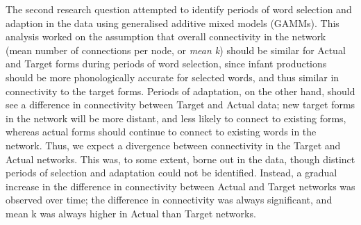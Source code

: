 \documentclass[
  man]{apa6}
\begin{document}
The second research question attempted to identify periods of word selection and adaption in the data using generalised additive mixed models (GAMMs). This analysis worked on the assumption that overall connectivity in the network (mean number of connections per node, or \emph{mean k}) should be similar for Actual and Target forms during periods of word selection, since infant productions should be more phonologically accurate for selected words, and thus similar in connectivity to the target forms. Periods of adaptation, on the other hand, should see a difference in connectivity between Target and Actual data; new target forms in the network will be more distant, and less likely to connect to existing forms, whereas actual forms should continue to connect to existing words in the network. Thus, we expect a divergence between connectivity in the Target and Actual networks. This was, to some extent, borne out in the data, though distinct periods of selection and adaptation could not be identified. Instead, a gradual increase in the difference in connectivity between Actual and Target networks was observed over time; the difference in connectivity was always significant, and mean k was always higher in Actual than Target networks.
\end{document}

